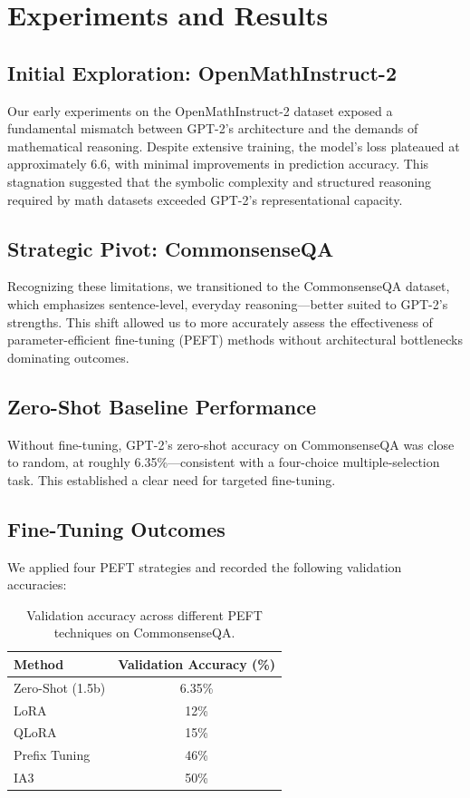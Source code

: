 \documentclass[11pt,twocolumn]{article}
\begin{document}
\section{Experiments and Results}
\label{sec:experiments}

\subsection{Initial Exploration: OpenMathInstruct-2}
Our early experiments on the OpenMathInstruct-2 dataset exposed a fundamental mismatch between GPT-2’s architecture and the demands of mathematical reasoning. Despite extensive training, the model's loss plateaued at approximately 6.6, with minimal improvements in prediction accuracy. This stagnation suggested that the symbolic complexity and structured reasoning required by math datasets exceeded GPT-2’s representational capacity.

\subsection{Strategic Pivot: CommonsenseQA}
Recognizing these limitations, we transitioned to the CommonsenseQA dataset, which emphasizes sentence-level, everyday reasoning—better suited to GPT-2's strengths. This shift allowed us to more accurately assess the effectiveness of parameter-efficient fine-tuning (PEFT) methods without architectural bottlenecks dominating outcomes.

\subsection{Zero-Shot Baseline Performance}
Without fine-tuning, GPT-2’s zero-shot accuracy on CommonsenseQA was close to random, at roughly 6.35\%—consistent with a four-choice multiple-selection task. This established a clear need for targeted fine-tuning.

\subsection{Fine-Tuning Outcomes}
We applied four PEFT strategies and recorded the following validation accuracies:

\begin{table}[h]
\centering
\renewcommand{\arraystretch}{1.2}
\begin{tabular}{|l|c|}
\hline
\textbf{Method} & \textbf{Validation Accuracy (\%)} \\
\hline
Zero-Shot (1.5b)& 6.35\%\\
LoRA & 12\% \\
QLoRA & 15\% \\
Prefix Tuning & 46\% \\
IA3 & 50\% \\
\hline
\end{tabular}
\caption{Validation accuracy across different PEFT techniques on CommonsenseQA.}
\label{table:validation-accuracy}
\end{table}
\end{document}

